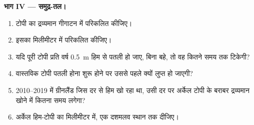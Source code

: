 \begin{problem}[{सप्ताहांत समस्या --- आकार, प्रवाह, संतुलन और
काल्पनिक हिम-टोपी का समुद्र-तल तुल्यांक}]
\medskip\noindent\textbf{भाग IV --- समुद्र-तल।}
\begin{enumerate}[resume]
\item टोपी का द्रव्यमान गीगाटन में परिकलित कीजिए।
\item इसका  मिलीमीटर में परिकलित कीजिए।
\item यदि पूरी टोपी प्रति वर्ष \qty{0.5}{m} हिम से पतली हो जाए, बिना बहे,
  तो वह कितने समय तक टिकेगी?
\item वास्तविक टोपी पतली होना शुरू होने पर उससे पहले
  क्यों लुप्त हो जाएगी?
\item 2010--2019 में ग्रीनलैंड जिस दर से हिम खो रहा था, उसी दर पर
  अर्केल टोपी के बराबर द्रव्यमान खोने में कितना समय लगेगा?
\item अर्केल हिम-टोपी का  मिलीमीटर में,
  एक दशमलव स्थान तक दीजिए।
\end{enumerate}
\end{problem}
